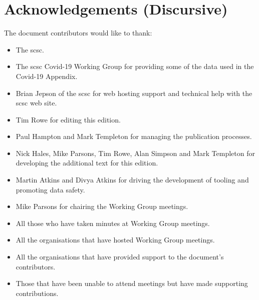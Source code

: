 %
%
\chapter{Acknowledgements (Discursive)} \label{bkm:acknowledgements}


The document contributors would like to thank:
\begin{itemize}
  \item The \gls{scsc}.
  \item The \gls{scsc} Covid-19 Working Group for providing some of the data used in the Covid-19 Appendix.
  \item Brian Jepson of the \gls{scsc} for web hosting support and technical help with the \gls{scsc} web site.
  \item
    Tim Rowe for editing this edition.
  \item Paul Hampton
    and
    Mark Templeton for managing the publication processes.
  \item
    Nick Hales, Mike Parsons, Tim Rowe, Alan Simpson and Mark Templeton
    for developing the additional text for this edition.
  \item
    Martin Atkins and Divya Atkins for driving the development of tooling and promoting data safety.
  \item Mike Parsons for chairing the Working Group meetings.
  \item All those who have taken minutes at Working Group meetings.
  \item
    All the organisations that have hosted Working Group meetings.
  \item All the organisations that have provided support to the document's contributors.
  \item Those that have been unable to attend meetings but have made supporting contributions.
\end{itemize}
